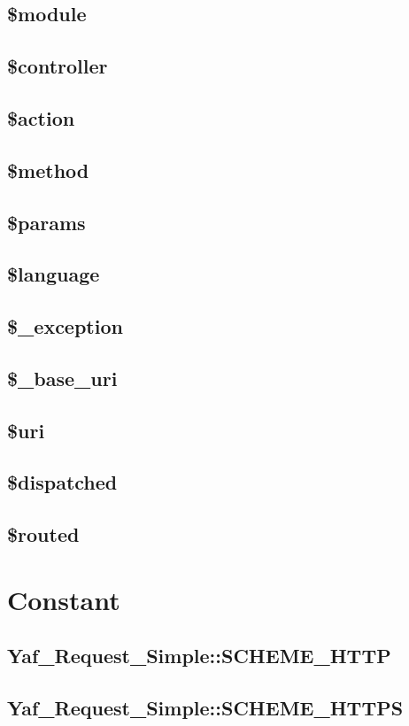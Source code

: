 \subsection{\$module}
\subsection{\$controller}
\subsection{\$action}
\subsection{\$method}
\subsection{\$params}
\subsection{\$language}
\subsection{\$\_exception}
\subsection{\$\_base\_uri}
\subsection{\$uri}
\subsection{\$dispatched}
\subsection{\$routed}

\section{Constant}


\subsection{Yaf\_Request\_Simple::SCHEME\_HTTP}


\subsection{Yaf\_Request\_Simple::SCHEME\_HTTPS}


